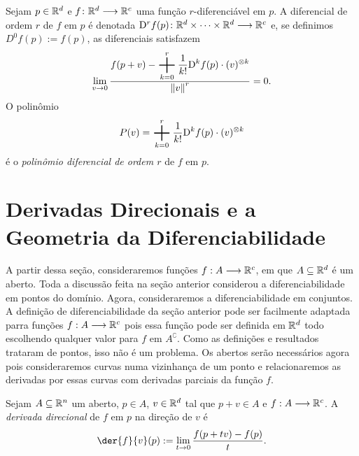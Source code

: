 \begin{nota}
Sejam $p \in \mathbb{R}^d$ e $f\colon \mathbb{R}^d \longrightarrow \mathbb{R}^c$ uma função $r$-diferenciável em $p$. A diferencial de ordem $r$ de $f$ em $p$ é denotada $\mathrm{D}^r f(p)\colon \mathbb{R}^d \times \cdots \times \mathbb{R}^d \longrightarrow \mathbb{R}^c$ e, se definimos $D^0f(p):=f(p)$, as diferenciais satisfazem
	\begin{equation*}
	\lim_{v \conv 0} \frac{\displaystyle f(p+v) - \sum_{k=0}^r \frac{1}{k!}\D^k f(p) \cdot (v)^{\otimes k}}{\nor{v}^r} = 0.
	\end{equation*}
O polinômio
	\begin{equation*}
	P(v) = \sum_{k=0}^r \frac{1}{k!}\D^k f(p) \cdot (v)^{\otimes k}
	\end{equation*}
é o \emph{polinômio diferencial de ordem $r$} de $f$ em $p$.
\end{nota}

\section{Derivadas Direcionais e a Geometria da Diferenciabilidade}

A partir dessa seção, consideraremos funções $f: A \longrightarrow \mathbb{R}^c$, em que $A \subseteq \mathbb{R}^d$ é um aberto. Toda a discussão feita na seção anterior considerou a diferenciabilidade em pontos do domínio. Agora, consideraremos a diferenciabilidade em conjuntos. A definição de diferenciabilidade da seção anterior pode ser facilmente adaptada parra funções $f: A \longrightarrow \mathbb{R}^c$ pois essa função pode ser definida em $\mathbb{R}^d$ todo escolhendo qualquer valor para $f$ em $A^\complement$. Como as definições e resultados trataram de pontos, isso não é um problema. Os abertos serão necessários agora pois consideraremos curvas numa vizinhança de um ponto e relacionaremos as derivadas por essas curvas com derivadas parciais da função $f$.

\begin{defi}
Sejam $A \subseteq \mathbb{R}^n$ um aberto, $p \in A$, $v \in \mathbb{R}^d$ tal que $p+v \in A$ e $f: A \longrightarrow \mathbb{R}^c$. A \emph{derivada direcional} de $f$ em $p$ na direção de $v$ é
	\begin{equation*}
	\der{f}{v}(p) := \lim_{t \conv 0} \frac{f(p+tv)-f(p)}{t}.
	\end{equation*}
\end{defi}

